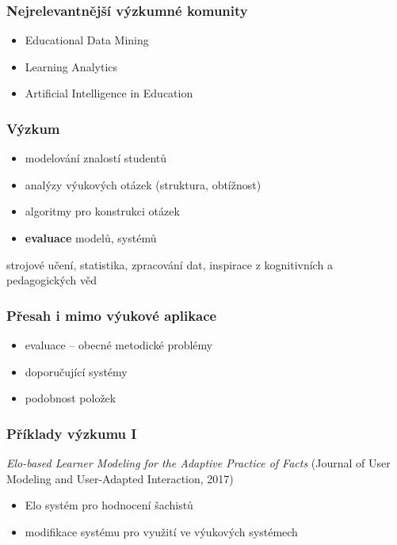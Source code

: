 \documentclass[bigger]{beamer}
\begin{document}
\begin{frame}
  \frametitle{Nejrelevantnější výzkumné komunity}

  \begin{itemize}
  \item Educational Data Mining
  \item Learning Analytics
  \item Artificial Intelligence in Education
  \end{itemize}
\end{frame}

\begin{frame}
  \frametitle{Výzkum}

  \begin{itemize}
  \item modelování znalostí studentů
  \item analýzy výukových otázek (struktura, obtížnost)
  \item algoritmy pro konstrukci otázek
  \item \textbf{evaluace} modelů, systémů
  \end{itemize}

  \bigskip

  strojové učení, statistika, zpracování dat, inspirace z kognitivních a
  pedagogických věd
\end{frame}

\begin{frame}
  \frametitle{Přesah i mimo výukové aplikace}

  \begin{itemize}
  \item evaluace -- obecné metodické problémy
  \item doporučující systémy
  \item podobnost položek
  \end{itemize}
\end{frame}

\begin{frame}
  \frametitle{Příklady výzkumu I}

  \emph{Elo-based Learner Modeling for the Adaptive Practice of Facts} (Journal
  of User Modeling and User-Adapted Interaction, 2017) 

  \bigskip

  \begin{itemize}
  \item Elo systém pro hodnocení šachistů
  \item modifikace systému pro využití ve výukových systémech
  \end{itemize}
\end{frame}
\end{document}
